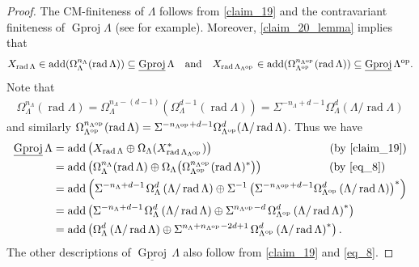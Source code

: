 \documentclass[12pt]{amsart}
\numberwithin{equation}{subsection}
\theoremstyle{plain}
\theoremstyle{definition}
\newcommand{\rad}{\operatorname{rad}}
\newcommand{\add}{\operatorname{add}}
\newcommand{\Gproj}{\operatorname{Gproj}}
\newcommand{\sGproj}{\underline{\operatorname{Gproj}}\,}
\renewcommand{\L}{\Lambda}
\newcommand{\op}{{\rm op}}
\begin{document}
\begin{proof}
The CM-finiteness of $\L$ follows from \cref{claim_19} and the contravariant finiteness of $\Gproj\L$ (see \cite[Corollary 2.3.6]{X-WChen_2017} for example).
Moreover, \cref{claim_20_lemma} implies that
\begin{align}\label{eq_8}
X_{\rad\L} \in \add(\Omega_\L^{n_\L}(\rad\L)) \subseteq\sGproj\L\quad\text{and}\quad    X_{\rad\L_{\L^\op}} \in \add(\Omega_{\L^\op}^{n_{\L^\op}}(\rad\L))\subseteq\sGproj\L^\op.
\end{align}
Note that 
\begin{align}
    \Omega_\L^{n_\L}(\rad\L) 
    = \Omega_\L^{n_\L-(d-1)}\!\left(\Omega_\L^{d-1}\!\left(\rad\L\right)\right)
    = \Sigma^{-n_\L+d-1}\Omega_\L^{d}\!\left(\L/\rad\L\right)
\end{align}
and similarly $\Omega_{\L^\op}^{n_{\L^\op}}(\rad\L) = \Sigma^{-n_{\L^\op}+d-1}\Omega_{\L^\op}^{d}\!\left(\L/\rad\L\right)$.
Thus we have 
\begin{align}
    \sGproj\L 
    &= \add\left(X_{\rad\L} \oplus \Omega_{\L}(X_{\rad\L_{\L^\op}}^*) \right) \hspace{36mm} (\text{by \cref{claim_19}})\\
    &= \add\left(\Omega_\L^{n_\L}(\rad\L) \oplus \Omega_{\L}\!\left(\Omega_{\L^\op}^{n_{\L^\op}}(\rad\L)^*\right) \right)  \hspace{20.5mm} (\text{by \eqref{eq_8}})\\
    &= \add\left(\Sigma^{-n_\L+d-1}\hspace{1pt}\Omega_\L^{d}\left(\L/\rad\L\right) \oplus \Sigma^{-1}\left(\Sigma^{-n_{\L^\op}+d-1}\Omega_{\L^\op}^{d}\left(\L/\rad\L\right)\right)^*\right)\\
    &= \add\left(\Sigma^{-n_\L+d-1}\hspace{1pt}\Omega_\L^{d}\left(\L/\rad\L\right) \oplus \Sigma^{n_{\L^\op}-d}\hspace{1.5pt}\Omega_{\L^\op}^{d}\left(\L/\rad\L\right)^* \right)\\
    &= \add\left(\Omega_\L^{d}\left(\L/\rad\L\right) \oplus \Sigma^{n_\L+n_{\L^\op}-2d+1}\hspace{1.5pt}\Omega_{\L^\op}^{d}\left(\L/\rad\L\right)^* \right).
\end{align}
The other descriptions of $\sGproj\L$  also follow from \cref{claim_19} and \eqref{eq_8}.
\end{proof}
\end{document}
